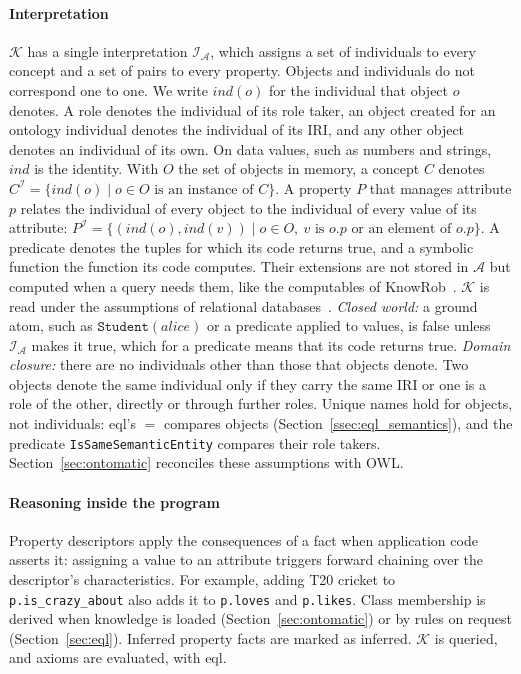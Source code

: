 \documentclass[sigconf,anonymous]{aamas}
\begin{document}
\paragraph{Interpretation}
$\mathcal{K}$ has a single interpretation $\mathcal{I}_{\mathcal{A}}$, which assigns a set of individuals to every concept and a set of pairs to every property. Objects and individuals do not correspond one to one. We write $\mathit{ind}(o)$ for the individual that object $o$ denotes. A role denotes the individual of its role taker, an object created for an ontology individual denotes the individual of its IRI, and any other object denotes an individual of its own. On data values, such as numbers and strings, $\mathit{ind}$ is the identity. With $O$ the set of objects in memory, a concept $C$ denotes $C^{\mathcal{I}}=\{\mathit{ind}(o)\mid o\in O \text{ is an instance of } C\}$. A property $P$ that manages attribute $p$ relates the individual of every object to the individual of every value of its attribute: $P^{\mathcal{I}}=\{(\mathit{ind}(o),\mathit{ind}(v))\mid o\in O,\ v \text{ is } o.p \text{ or an element of } o.p\}$. A predicate denotes the tuples for which its code returns true, and a symbolic function the function its code computes. Their extensions are not stored in $\mathcal{A}$ but computed when a query needs them, like the computables of KnowRob~\cite{Tenorth2013}. $\mathcal{K}$ is read under the assumptions of relational databases~\cite{Reiter1978,reiter1984relational}. \emph{Closed world:} a ground atom, such as $\texttt{Student}(\mathit{alice})$ or a predicate applied to values, is false unless $\mathcal{I}_{\mathcal{A}}$ makes it true, which for a predicate means that its code returns true. \emph{Domain closure:} there are no individuals other than those that objects denote. Two objects denote the same individual only if they carry the same IRI or one is a role of the other, directly or through further roles. Unique names hold for objects, not individuals: \ac{eql}'s $=$ compares objects (Section~\ref{ssec:eql_semantics}), and the predicate \texttt{IsSameSemanticEntity} compares their role takers. Section~\ref{sec:ontomatic} reconciles these assumptions with OWL.

\paragraph{Reasoning inside the program}
Property descriptors apply the consequences of a fact when application code asserts it: assigning a value to an attribute triggers forward chaining over the descriptor's characteristics. For example, adding T20 cricket to \texttt{p.is\_crazy\_about} also adds it to \texttt{p.loves} and \texttt{p.likes}. Class membership is derived when knowledge is loaded (Section~\ref{sec:ontomatic}) or by rules on request (Section~\ref{sec:eql}). Inferred property facts are marked as inferred. $\mathcal{K}$ is queried, and axioms are evaluated, with \ac{eql}.
\end{document}
